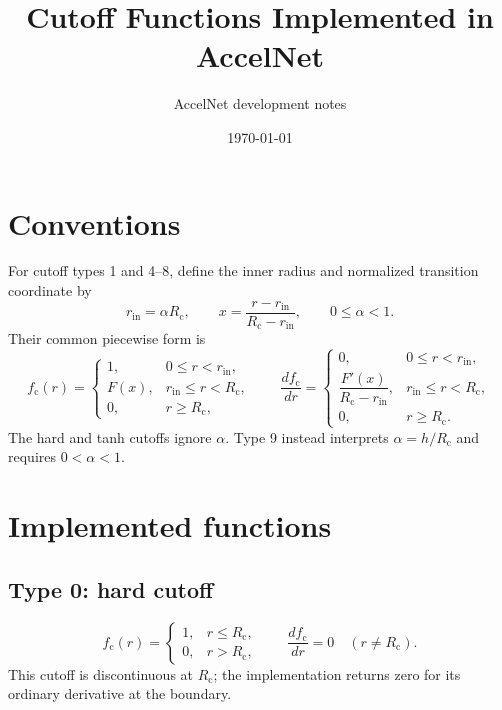 \documentclass[11pt,a4paper]{article}
\title{Cutoff Functions Implemented in AccelNet}
\author{AccelNet development notes}
\date{\today}
\newcommand{\rc}{R_{\mathrm c}}
\newcommand{\fc}{f_{\mathrm c}}
\begin{document}
\maketitle

\section{Conventions}

For cutoff types 1 and 4--8, define the inner radius and normalized transition
coordinate by
\begin{equation}
  r_{\mathrm{in}}=\alpha\rc,
  \qquad
  x=\frac{r-r_{\mathrm{in}}}{\rc-r_{\mathrm{in}}},
  \qquad 0\leq\alpha<1.
\end{equation}
Their common piecewise form is
\begin{equation}
  \fc(r)=
  \begin{cases}
    1, & 0\leq r<r_{\mathrm{in}},\\
    F(x), & r_{\mathrm{in}}\leq r<\rc,\\
    0, & r\geq\rc,
  \end{cases}
  \qquad
  \frac{d\fc}{dr}=
  \begin{cases}
    0, & 0\leq r<r_{\mathrm{in}},\\
    \dfrac{F'(x)}{\rc-r_{\mathrm{in}}}, & r_{\mathrm{in}}\leq r<\rc,\\
    0, & r\geq\rc.
  \end{cases}
\end{equation}
The hard and tanh cutoffs ignore $\alpha$.  Type 9 instead interprets
$\alpha=h/\rc$ and requires $0<\alpha<1$.

\section{Implemented functions}

\subsection*{Type 0: hard cutoff}
\begin{equation}
  \fc(r)=\begin{cases}1,&r\leq\rc,\\0,&r>\rc,\end{cases}
  \qquad \frac{d\fc}{dr}=0\quad(r\neq\rc).
\end{equation}
This cutoff is discontinuous at $\rc$; the implementation returns zero for
its ordinary derivative at the boundary.
\end{document}

